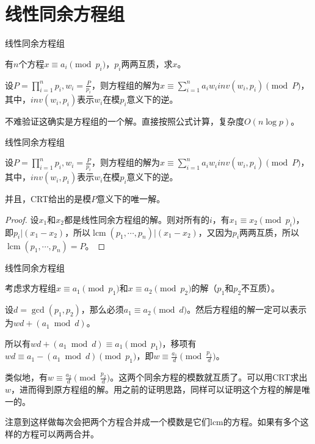 \documentclass{ctexbeamer}        %
\newcommand{\lcm}{\operatorname{lcm}}
\begin{document}
\section{线性同余方程组}
\begin{frame}{线性同余方程组}
\begin{definition}[线性同余方程组]
    有$n$个方程$x\equiv a_i \pmod{p_i}$，$p_i$两两互质，求$x$。
\end{definition}
\begin{theorem}
    设$P=\prod_{i=1}^n p_i,w_i=\frac{P}{p_i}$，则方程组的解为$x \equiv \sum_{i=1}^n a_iw_i inv(w_i,p_i) \pmod P$，其中，$inv(w_i,p_i)$表示$w_i$在模$p_i$意义下的逆。
\end{theorem}
不难验证这确实是方程组的一个解。直接按照公式计算，复杂度$O(n\log p)$。
\end{frame}

\begin{frame}{线性同余方程组}
\begin{theorem}
    设$P=\prod_{i=1}^n p_i,w_i=\frac{P}{p_i}$，则方程组的解为$x \equiv \sum_{i=1}^n a_iw_i inv(w_i,p_i) \pmod P$，其中，$inv(w_i,p_i)$表示$w_i$在模$p_i$意义下的逆。

    并且，CRT给出的是模$P$意义下的唯一解。
\end{theorem}

\begin{proof}
    设$x_1$和$x_2$都是线性同余方程组的解。则对所有的$i$，有$x_1\equiv x_2 \pmod{p_i}$，即$p_i|(x_1-x_2)$，所以$\lcm(p_1,\cdots,p_n)|(x_1-x_2)$，又因为$p_i$两两互质，所以$\lcm(p_1,\cdots,p_n)=P$。
\end{proof}
\end{frame}

\begin{frame}{线性同余方程组}
\begin{example}[exCRT]
    考虑求方程组$x\equiv a_1 \pmod{p_1}$和$x\equiv a_2 \pmod{p_2}$的解（$p_1$和$p_2$不互质）。
\end{example}
设$d=\gcd(p_1,p_2)$，那么必须$a_1\equiv a_2 \pmod d$。然后方程组的解一定可以表示为$wd+(a_1 \bmod d)$。

所以有$wd+(a_1 \bmod d) \equiv a_1 \pmod{p_1} $，移项有$wd \equiv a_1-(a_1 \bmod d) \pmod{p_1} $，即$w \equiv \frac{a_1}{d} \pmod{\frac{p_1}{d}}$。

类似地，有$w \equiv \frac{a_2}{d} \pmod{\frac{p_2}{d}}$。这两个同余方程的模数就互质了。可以用CRT求出$w$，进而得到原方程组的解。用之前的证明思路，同样可以证明这个方程的解是唯一的。

注意到这样做每次会把两个方程合并成一个模数是它们lcm的方程。如果有多个这样的方程可以两两合并。
\end{frame}
\end{document}
